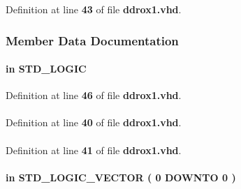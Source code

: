 Definition at line {\bf 43} of file {\bf ddrox1.\+vhd}.



\subsubsection{Member Data Documentation}
\paragraph[{aclr}]{ {\bfseries \textcolor{keywordflow}{in}\textcolor{vhdlchar}{ }} {\bfseries \textcolor{comment}{S\+T\+D\+\_\+\+L\+O\+G\+IC}\textcolor{vhdlchar}{ }} \hspace{0.3cm}{\ttfamily [Port]}}\label{classddrox1_a8bc90b7127d506c19a0fd39262a96581}


Definition at line {\bf 46} of file {\bf ddrox1.\+vhd}.

\paragraph[{altera\+\_\+mf}]{\hspace{0.3cm}{\ttfamily [Library]}}\label{classddrox1_ad57cd8d31a38ff87ac163fb47757ffbf}


Definition at line {\bf 40} of file {\bf ddrox1.\+vhd}.

\paragraph[{altera\+\_\+mf\+\_\+components}]{\hspace{0.3cm}{\ttfamily [Package]}}\label{classddrox1_a421d8a97945a4307e385df667430facb}


Definition at line {\bf 41} of file {\bf ddrox1.\+vhd}.

\paragraph[{datain\+\_\+h}]{ {\bfseries \textcolor{keywordflow}{in}\textcolor{vhdlchar}{ }} {\bfseries \textcolor{comment}{S\+T\+D\+\_\+\+L\+O\+G\+I\+C\+\_\+\+V\+E\+C\+T\+OR}\textcolor{vhdlchar}{ }\textcolor{vhdlchar}{(}\textcolor{vhdlchar}{ }\textcolor{vhdlchar}{ } \textcolor{vhdldigit}{0} \textcolor{vhdlchar}{ }\textcolor{keywordflow}{D\+O\+W\+N\+TO}\textcolor{vhdlchar}{ }\textcolor{vhdlchar}{ } \textcolor{vhdldigit}{0} \textcolor{vhdlchar}{ }\textcolor{vhdlchar}{)}\textcolor{vhdlchar}{ }} \hspace{0.3cm}{\ttfamily [Port]}}\label{classddrox1_a6a433183ec358d09ee39500ff88799d5}


